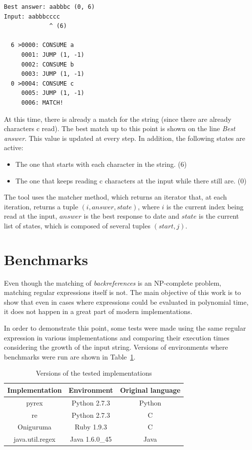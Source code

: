 \documentclass{llncs}
\begin{document}
\begin{verbatim}
Best answer: aabbbc (0, 6)
Input: aabbbcccc
             ^ (6)

  6 >0000: CONSUME a
     0001: JUMP (1, -1)
     0002: CONSUME b
     0003: JUMP (1, -1)
  0 >0004: CONSUME c
     0005: JUMP (1, -1)
     0006: MATCH!
\end{verbatim}

At this time, there is already a match for the string (since there are already  characters c read). The best match up to this point is shown on the line \emph {Best answer}. This value is updated at every step. In addition, the following states are active:


\begin{itemize}
\item{The one that starts with each character in the string. (6)}
\item{The one that keeps reading c characters at the input while there still are. (0)}
\end{itemize}

The tool uses the matcher method, which returns an iterator that, at each iteration, returns a tuple $(i, answer, state)$, where $i$ is the current index being read at the input, $answer$ is the best response to date and $state$ is the current list of states, which is composed of several tuples $(start, j)$. 

\section{Benchmarks}

Even though the matching of \emph{backreferences} is an NP-complete problem, matching regular expressions itself is not. The main objective of this work is to show that even in cases where expressions could be evaluated in polynomial time, it does not happen in a great part of modern implementations.

In order to demonstrate this point, some tests were made using the same regular expression in various implementations and comparing their execution times considering the growth of the input string. Versions of environments where benchmarks were run are shown in Table~\ref{table:versions}. 

\begin{table}
\begin{center}
	\caption{Versions of the tested implementations}
	\begin{tabular}{ c | c | c }
		\hline 
		{\bf Implementation} & {\bf Environment} & {\bf Original language} \\
		\hline 
		pyrex & Python 2.7.3 & Python \\
		re & Python 2.7.3 & C \\
		Oniguruma & Ruby 1.9.3 & C \\
		java.util.regex & Java 1.6.0\_45 & Java \\
		\hline 
	\end{tabular}
	\label{table:versions}
\end{center}
\end{table}
\end{document}
